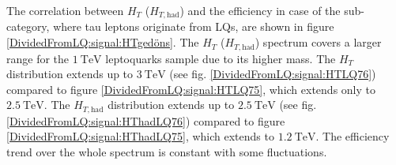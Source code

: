 %
%
The correlation between $H_{T}$ ($H_{T,\text{had}}$) and the efficiency in case of the sub-category, where tau leptons originate from LQs, are shown in figure \ref{DividedFromLQ:signal:HTgedöns}. The $H_T$ ($H_{T,\text{had}}$) spectrum covers a larger range for the $\SI{1}{\tera\electronvolt}$ leptoquarks sample due to its higher mass. The $H_T$ distribution extends up to $\SI{3}{\tera\electronvolt}$ (see fig. \ref{DividedFromLQ:signal:HTLQ76}) compared to figure \ref{DividedFromLQ:signal:HTLQ75}, which extends only to $\SI{2.5}{\tera\electronvolt}$. The $H_{T,\text{had}}$ distribution extends up to $\SI{2.5}{\tera\electronvolt}$ (see fig. \ref{DividedFromLQ:signal:HThadLQ76}) compared to figure \ref{DividedFromLQ:signal:HThadLQ75}, which extends to $\SI{1.2}{\tera\electronvolt}$. The efficiency trend over the whole spectrum is constant with some fluctuations.\newline
%

